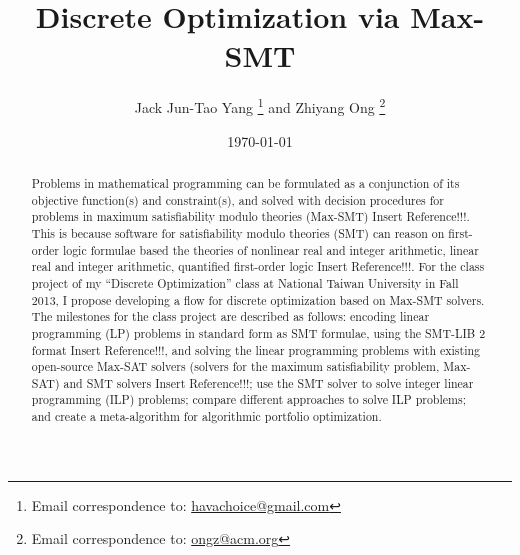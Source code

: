 \documentclass[letter,12pt]{article}
\begin{document}
\title{Discrete Optimization via Max-SMT}
\date{\today}
\author{Jack Jun-Tao Yang 
	\thanks{Email correspondence to: \href{mailto:havachoice@gmail.com}{havachoice@gmail.com}}
	and Zhiyang Ong
	\thanks{Email correspondence to: \href{mailto:ongz@acm.org}{ongz@acm.org}}
}
\maketitle



\begin{abstract}
Problems in mathematical programming can be formulated as a conjunction of its objective function(s) and constraint(s), and solved with decision procedures for problems in maximum satisfiability modulo theories (Max-SMT) {\LARGE Insert Reference!!!}. This is because software for satisfiability modulo theories (SMT) can reason on first-order logic formulae based the theories of nonlinear real and integer arithmetic, linear real and integer arithmetic, quantified first-order logic {\LARGE Insert Reference!!!}. For the class project of my ``Discrete Optimization'' class at National Taiwan University in Fall 2013, I propose developing a flow for discrete optimization based on Max-SMT solvers. The milestones for the class project are described as follows: encoding linear programming (LP) problems in standard form as SMT formulae, using the SMT-LIB 2 format {\LARGE Insert Reference!!!}, and solving the linear programming problems with existing open-source Max-SAT solvers (solvers for the maximum satisfiability problem, Max-SAT) and SMT solvers {\LARGE Insert Reference!!!}; use the SMT solver to solve integer linear programming (ILP) problems; compare different approaches to solve ILP problems; and create a meta-algorithm for algorithmic portfolio optimization.
\end{abstract}
\end{document}
